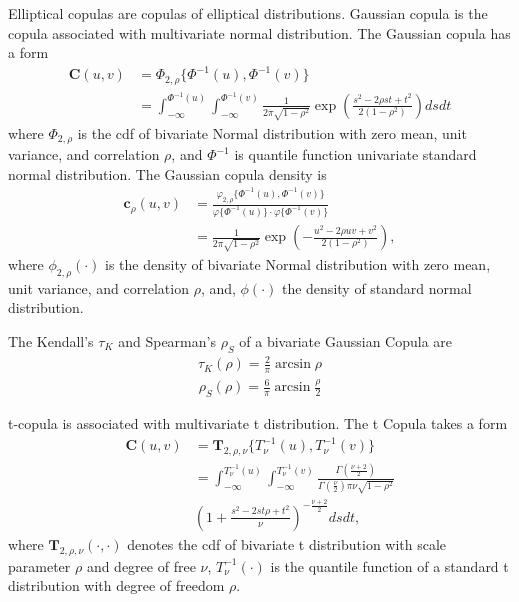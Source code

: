 Elliptical copulas are copulas of elliptical distributions.
Gaussian copula is the copula associated with multivariate normal distribution.
The Gaussian copula has a form
    \begin{align}
        \bm{C}(u,v) &= \Phi_{2, \rho}\{\Phi^{-1}(u), \Phi^{-1}(v)\} \\
                    &= \int_{-\infty}^{\Phi^{-1}(u)}
                       \int_{-\infty}^{\Phi^{-1}(v)}
                       \frac{1}{2\pi\sqrt{1-\rho^2}}
                       \exp{\left(
                       \frac{s^2-2\rho st+t^2}{2(1-\rho^2)}
                       \right)} ds dt
        \end{align}
where $\Phi_{2, \rho}$ is the cdf of bivariate Normal distribution with zero mean, unit variance, and correlation $\rho$,
and $\Phi^{-1}$ is quantile function univariate standard normal distribution.
The Gaussian copula density is
\begin{align}
    \bm{c}_\rho(u,v) &= \frac{\varphi_{2,\rho}\{\Phi^{-1}(u), \Phi^{-1}(v)\}}
                        {\varphi\{\Phi^{-1}(u)\} \cdot \varphi\{\Phi^{-1}(v)\}}\\
                &= \frac{1}{2\pi\sqrt{1-\rho^2}}\exp\left(
                   -\frac{u^2 - 2\rho uv + v^2}{2(1-\rho^2)}
                   \right),
    \end{align}
where $\phi_{2,\rho}(\cdot)$ is the density of bivariate Normal distribution with zero mean,
unit variance,
and correlation $\rho$,
and, $\phi(\cdot)$ the density of standard normal distribution.\medskip

The Kendall's $\tau_K$ and Spearman's $\rho_S$ of a bivariate Gaussian Copula are
    \begin{align}
        \tau_K(\rho) = \frac{2}{\pi}\arcsin\rho
        \end{align}
    \begin{align}
        \rho_S(\rho) = \frac{6}{\pi}\arcsin\frac{\rho}{2}
        \end{align}\medskip

t-copula is associated with multivariate t distribution.
The t Copula takes a form
\begin{align}
        \bm{C}(u,v) &= \bm{T}_{2, \rho, \nu}\{T^{-1}_\nu(u), T^{-1}_\nu(v)\} \\
            &= \int_{-\infty}^{T^{-1}_\nu(u)}
               \int_{-\infty}^{T^{-1}_\nu(v)}
            \frac{\Gamma\left(\frac{\nu+2}{2}\right)}
            {\Gamma\left(\frac{\nu}{2}\right)\pi\nu\sqrt{1-\rho^2}}\\
           & \left(
        1+\frac{s^2-2st\rho+t^2}{\nu}
        \right)^{-\frac{\nu+2}{2}} ds dt,
    \end{align}
where $\bm{T}_{2, \rho, \nu}(\cdot, \cdot)$ denotes the cdf of bivariate t distribution with scale parameter $\rho$ and degree of free $\nu$,
$T^{-1}_\nu(\cdot)$ is the quantile function of a standard t distribution with degree of freedom $\rho$.

